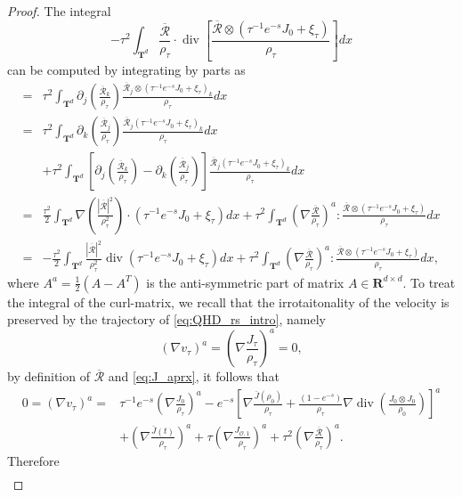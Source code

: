 \documentclass[english]{amsart}
\theoremstyle{plain}
\theoremstyle{definition}
\theoremstyle{remark}
\theoremstyle{plain}
\theoremstyle{plain}
\theoremstyle{plain}
\def\R{{\mathbf R}}%
\def\T{{\mathbf T}}%
\def\d{{\partial}}
\DeclareMathOperator{\diver}{div}
\numberwithin{equation}{section}
\begin{document}
\begin{proof}
The integral
\[
-\tau^2\int_{\T^d} \frac{\overline{\mathcal{R}}}{\rho_\tau}\cdot\diver\left[\frac{\overline{\mathcal{R}}\otimes(\tau^{-1}e^{-s}J_0+\xi_\tau)}{\rho_\tau}\right]dx
\]
can be computed by integrating by parts as
\begin{align*}
=&\tau^2\int_{\T^d} \d_j\left(\frac{\overline{\mathcal{R}}_k}{\rho_\tau}\right)\frac{\overline{\mathcal{R}}_j\otimes(\tau^{-1}e^{-s}J_0+\xi_\tau)_k}{\rho_\tau}dx\\
=&\tau^2\int_{\T^d} \d_k\left(\frac{\overline{\mathcal{R}}_j}{\rho_\tau}\right)\frac{\overline{\mathcal{R}}_j(\tau^{-1}e^{-s}J_0+\xi_\tau)_k}{\rho_\tau}dx\\
&+\tau^2\int_{\T^d} \left[\d_j\left(\frac{\overline{\mathcal{R}}_k}{\rho_\tau}\right)-\d_k\left(\frac{\overline{\mathcal{R}}_j}{\rho_\tau}\right)\right]\frac{\overline{\mathcal{R}}_j(\tau^{-1}e^{-s}J_0+\xi_\tau)_k}{\rho_\tau}dx\\
=&\frac{\tau^2}{2}\int_{\T^d} \nabla\left(\frac{|\overline{\mathcal{R}}|^2}{\rho_\tau^2}\right)\cdot(\tau^{-1}e^{-s}J_0+\xi_\tau) dx+\tau^2\int_{\T^d} \left(\nabla\frac{\overline{\mathcal{R}}}{\rho_\tau}\right)^a:\frac{\overline{\mathcal{R}}\otimes(\tau^{-1}e^{-s}J_0+\xi_\tau)}{\rho_\tau}dx\\
=&-\frac{\tau^2}{2}\int_{\T^d}\frac{|\overline{\mathcal{R}}|^2}{\rho_\tau^2}\diver(\tau^{-1}e^{-s}J_0+\xi_\tau)dx+\tau^2\int_{\T^d} \left(\nabla\frac{\overline{\mathcal{R}}}{\rho_\tau}\right)^a:\frac{\overline{\mathcal{R}}\otimes(\tau^{-1}e^{-s}J_0+\xi_\tau)}{\rho_\tau}dx,
\end{align*}
where $A^a=\frac12(A-A^T)$ is the anti-symmetric part of matrix $A\in\R^{d\times d}$. 
To treat the integral of the curl-matrix, we recall that the irrotaitonality of the velocity is preserved by the trajectory of \eqref{eq:QHD_rs_intro}, namely 
\[
(\nabla v_\tau)^a=\left(\nabla\frac{J_\tau}{\rho_\tau}\right)^a=0,
\]
by definition of $\overline{\mathcal{R}}$ and \eqref{eq:J_aprx}, it follows that
\begin{align*}
0=(\nabla v_\tau)^a=&\tau^{-1} e^{-s}\left(\nabla\frac{J_0}{\rho_\tau}\right)^a-e^{-s}\left[\nabla\frac{\bar J(\rho_0)}{\rho_\tau}+\frac{(1-e^{-s})}{\rho_\tau}\nabla\diver\left(\frac{J_0\otimes J_0}{\rho_0}\right)\right]^a\\
&+\left(\nabla\frac{\bar J(t)}{\rho_\tau}\right)^a+\tau \left(\nabla\frac{J_{\mathcal{O},1}}{\rho_\tau}\right)^a+\tau^2 \left(\nabla\frac{\overline{\mathcal{R}}}{\rho_\tau}\right)^a.
\end{align*}
Therefore
\begin{align*}

\end{align*}
\end{proof}
\end{document}
